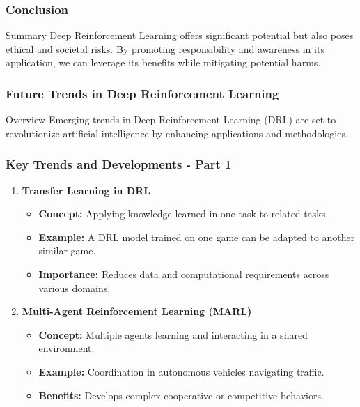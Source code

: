 \documentclass[aspectratio=169]{beamer}
\begin{document}
\begin{frame}[fragile]
    \frametitle{Conclusion}
    \begin{block}{Summary}
        Deep Reinforcement Learning offers significant potential but also poses ethical and societal risks. By promoting responsibility and awareness in its application, we can leverage its benefits while mitigating potential harms.
    \end{block}
\end{frame}

\begin{frame}[fragile]
    \frametitle{Future Trends in Deep Reinforcement Learning}
    \begin{block}{Overview}
        Emerging trends in Deep Reinforcement Learning (DRL) are set to revolutionize artificial intelligence by enhancing applications and methodologies.
    \end{block}
\end{frame}

\begin{frame}[fragile]
    \frametitle{Key Trends and Developments - Part 1}
    \begin{enumerate}
        \item \textbf{Transfer Learning in DRL}
            \begin{itemize}
                \item \textbf{Concept:} Applying knowledge learned in one task to related tasks.
                \item \textbf{Example:} A DRL model trained on one game can be adapted to another similar game.
                \item \textbf{Importance:} Reduces data and computational requirements across various domains.
            \end{itemize}
        
        \item \textbf{Multi-Agent Reinforcement Learning (MARL)}
            \begin{itemize}
                \item \textbf{Concept:} Multiple agents learning and interacting in a shared environment.
                \item \textbf{Example:} Coordination in autonomous vehicles navigating traffic.
                \item \textbf{Benefits:} Develops complex cooperative or competitive behaviors.
            \end{itemize}
    \end{enumerate}
\end{frame}
\end{document}
